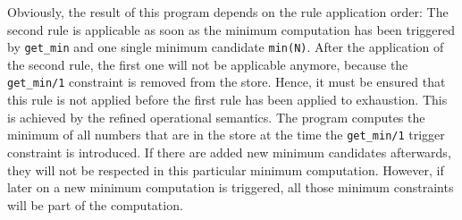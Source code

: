 Obviously, the result of this program depends on the rule application order: The second rule is applicable as soon as the minimum computation has been triggered by \lstinline|get_min| and one single minimum candidate \lstinline|min(N)|. After the application of the second rule, the first one will not be applicable anymore, because the \lstinline|get_min/1| constraint is removed from the store. Hence, it must be ensured that this rule is not applied before the first rule has been applied to exhaustion. This is achieved by the refined operational semantics. The program computes the minimum of all numbers that are in the store at the time the \lstinline|get_min/1| trigger constraint is introduced. If there are added new minimum candidates afterwards, they will not be respected in this particular minimum computation. However, if later on a new minimum computation is triggered, all those minimum constraints will be part of the computation.


